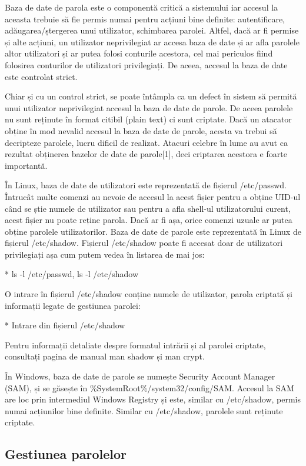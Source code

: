 Baza de date de parola este o componentă critică a sistemului iar accesul la
aceasta trebuie să fie permis numai pentru acțiuni bine definite: autentificare,
adăugarea/ștergerea unui utilizator, schimbarea parolei. Altfel, dacă ar fi
permise și alte acțiuni, un utilizator neprivilegiat ar accesa baza de date și
ar afla parolele altor utilizatori și ar putea folosi conturile acestora, cel
mai periculos fiind folosirea conturilor de utilizatori privilegiați. De aceea,
accesul la baza de date este controlat strict.

Chiar și cu un control strict, se poate întâmpla ca un defect în sistem să
permită unui utilizator neprivilegiat accesul la baza de date de parole. De
aceea parolele nu sunt reținute în format citibil (plain text) ci sunt criptate.
Dacă un atacator obține în mod nevalid accesul la baza de date de parole, acesta
va trebui să decripteze parolele, lucru dificil de realizat. Atacuri celebre în
lume au avut ca rezultat obținerea bazelor de date de parole[1], deci criptarea
acestora e foarte importantă.

În Linux, baza de date de utilizatori este reprezentată de fișierul /etc/passwd.
Întrucât multe comenzi au nevoie de accesul la acest fișier pentru a obține
UID-ul când se știe numele de utilizator sau pentru a afla shell-ul
utilizatorului curent, acest fișier nu poate reține parola. Dacă ar fi așa,
orice comenzi uzuale ar putea obține parolele utilizatorilor. Baza de date de
parole este reprezentată în Linux de fișierul /etc/shadow. Fișierul /etc/shadow
poate fi accesat doar de utilizatori privilegiați așa cum putem vedea în
listarea de mai jos:

* ls -l /etc/passwd, ls -l /etc/shadow

O intrare în fișierul /etc/shadow conține numele de utilizator, parola criptată
și informații legate de gestiunea parolei:

* Intrare din fișierul /etc/shadow

Pentru informații detaliate despre formatul intrării și al parolei criptate, consultați pagina de manual man shadow și man crypt.

În Windows, baza de date de parole se numește Security Account Manager (SAM), și
se găsește în \%SystemRoot\%/system32/config/SAM. Accesul la SAM are loc prin
intermediul Windows Registry și este, similar cu /etc/shadow, permis numai
acțiunilor bine definite. Similar cu /etc/shadow, parolele sunt reținute
criptate.

\subsection{Gestiunea parolelor}
\label{sec:users-auth-pass-gestiune}

